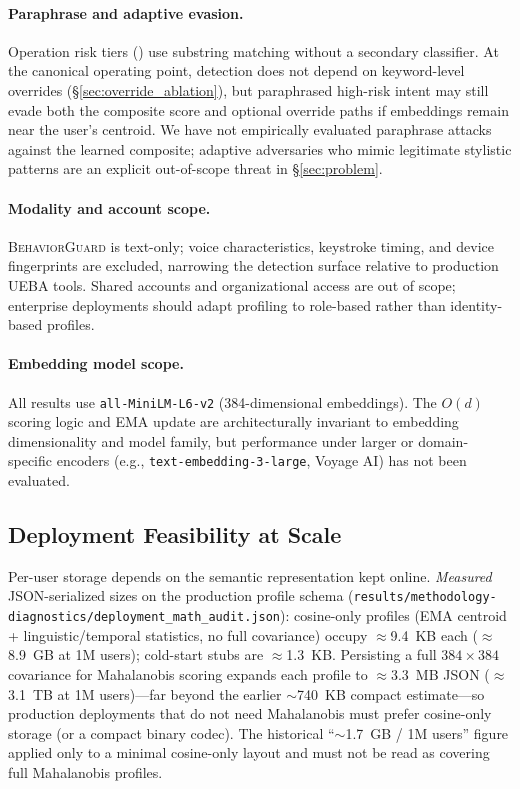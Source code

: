 \documentclass[conference]{IEEEtran}
\newcommand{\BG}{\textsc{BehaviorGuard}}
\begin{document}
\paragraph{Paraphrase and adaptive evasion.}
Operation risk tiers () use substring matching without a
secondary classifier.
At the canonical operating point, detection does not depend on keyword-level overrides
(\S\ref{sec:override_ablation}), but paraphrased high-risk intent may still evade both
the composite score and optional override paths if embeddings remain near the user's
centroid.
We have not empirically evaluated paraphrase attacks against the learned composite;
adaptive adversaries who mimic legitimate stylistic patterns are an explicit
out-of-scope threat in \S\ref{sec:problem}.

\paragraph{Modality and account scope.}
\BG{} is text-only; voice characteristics, keystroke timing, and device fingerprints are
excluded, narrowing the detection surface relative to production UEBA tools. Shared
accounts and organizational access are out of scope; enterprise deployments should adapt
profiling to role-based rather than identity-based profiles.

\paragraph{Embedding model scope.}
All results use \texttt{all-MiniLM-L6-v2} (384-dimensional embeddings).
The $O(d)$ scoring logic and EMA update are architecturally invariant to embedding
dimensionality and model family, but performance under larger or domain-specific
encoders (e.g., \texttt{text-embedding-3-large}, Voyage AI) has not been evaluated.

\subsection{Deployment Feasibility at Scale}

Per-user storage depends on the semantic representation kept online.
\emph{Measured} JSON-serialized sizes on the production profile schema
(\texttt{results/methodology-diagnostics/deployment\_math\_audit.json}): cosine-only profiles (EMA
centroid + linguistic/temporal statistics, no full covariance) occupy
$\approx$9.4~KB each ($\approx$8.9~GB at 1M users); cold-start stubs are
$\approx$1.3~KB.
Persisting a full $384{\times}384$ covariance for Mahalanobis scoring expands each
profile to $\approx$3.3~MB JSON ($\approx$3.1~TB at 1M users)---far beyond the
earlier $\sim$740~KB compact estimate---so production deployments that do not need
Mahalanobis must prefer cosine-only storage (or a compact binary codec).
The historical ``$\sim$1.7~GB / 1M users'' figure applied only to a minimal
cosine-only layout and must not be read as covering full Mahalanobis profiles.
\end{document}
